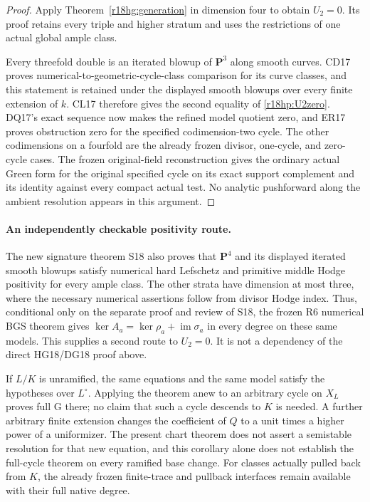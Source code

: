 \begin{proof}
Apply Theorem~\ref{r18hg:generation} in dimension four to
obtain $U_2=0$.  Its proof retains every triple and higher stratum
and uses the restrictions of one actual global ample class.

Every threefold double is an iterated blowup of $\mathbf P^3$
along smooth curves.  CD17 proves numerical-to-geometric-cycle-class
comparison for its curve classes, and this statement is retained
under the displayed smooth blowups over every finite extension of
$k$.  CL17 therefore gives the second equality of
\eqref{r18hp:U2zero}.  DQ17's exact sequence now makes the refined
model quotient zero, and ER17 proves obstruction zero for the
specified codimension-two cycle.  The other codimensions on a
fourfold are the already frozen divisor, one-cycle, and zero-cycle
cases.  The frozen original-field reconstruction gives the
ordinary actual Green form for the original specified cycle on
its exact support complement and its identity against every
compact actual test.  No analytic pushforward along the ambient
resolution appears in this argument.
\end{proof}

\paragraph{An independently checkable positivity route.}
The new signature theorem S18 also proves that $\mathbf P^4$
and its displayed iterated smooth blowups satisfy numerical
hard Lefschetz and primitive middle Hodge positivity for every
ample class.  The other strata have dimension at most three,
where the necessary numerical assertions follow from divisor
Hodge index.  Thus, conditional only on the separate proof and
review of S18, the frozen R6 numerical BGS theorem gives
$\ker A_a=\ker\rho_a+\operatorname{im}\sigma_a$ in every degree
on these same models.  This supplies a second route to $U_2=0$.
It is not a dependency of the direct HG18/DG18 proof above.

\begin{remark}
If $L/K$ is unramified, the same equations and the same model
satisfy the hypotheses over $L^\circ$.  Applying the theorem anew
to an arbitrary cycle on $X_L$ proves full G there; no claim that
such a cycle descends to $K$ is needed.  A further arbitrary
finite extension changes the coefficient of $Q$ to a unit times
a higher power of a uniformizer.  The present chart theorem does
not assert a semistable resolution for that new equation, and
this corollary alone does not establish the full-cycle theorem
on every ramified base change.  For classes actually pulled back
from $K$, the already frozen finite-trace and pullback interfaces
remain available with their full native degree.
\end{remark}

